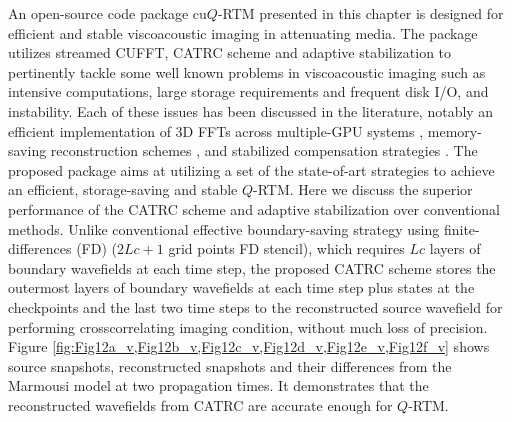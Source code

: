 An open-source code package cu$Q$-RTM presented in this chapter is designed for efficient and stable viscoacoustic imaging in attenuating media. The package utilizes streamed CUFFT, CATRC scheme and adaptive stabilization to pertinently tackle some well known problems in viscoacoustic imaging such as intensive computations, large storage requirements and frequent disk I/O, and instability. Each of these issues has been discussed in the literature, notably an efficient implementation of 3D FFTs across multiple-GPU systems \citep{nandapalan2012implementation, czechowski2012communication}, memory-saving reconstruction schemes \citep{Anderson2012Time, yang2016wavefield, wang2017wavefield}, and stabilized compensation strategies \citep{Zhu2014Q, sun2015stable, wang2017regularized}. The proposed package aims at utilizing a set of the state-of-art strategies to achieve an efficient, storage-saving and stable $Q$-RTM. Here we discuss the superior performance of the CATRC scheme and adaptive stabilization over conventional methods. Unlike conventional effective boundary-saving strategy using finite-differences (FD) ($2Lc+1$ grid points FD stencil), which requires $Lc$ layers of boundary wavefields at each time step, the proposed CATRC scheme stores the outermost layers of boundary wavefields at each time step plus states at the checkpoints and the last two time steps to the reconstructed source wavefield for performing crosscorrelating imaging condition, without much loss of precision. Figure \ref{fig:Fig12a_v,Fig12b_v,Fig12c_v,Fig12d_v,Fig12e_v,Fig12f_v} shows source snapshots, reconstructed snapshots and their differences from the Marmousi model at two propagation times. It demonstrates that the reconstructed wavefields from CATRC are accurate enough for $Q$-RTM. 






